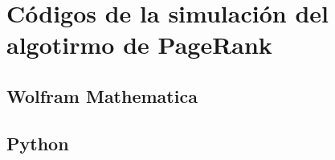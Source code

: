 \chapter{Códigos de la simulación del algotirmo de PageRank}
\label{ch:pagerankcod}

\section{Wolfram Mathematica}

\section{Python}

